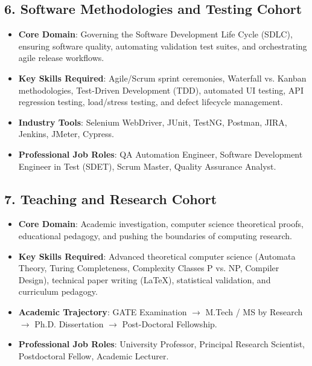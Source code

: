 \subsection{6. Software Methodologies and Testing Cohort}
\begin{itemize}[leftmargin=1.5em]
    \item \textbf{Core Domain}: Governing the Software Development Life Cycle (SDLC), ensuring software quality, automating validation test suites, and orchestrating agile release workflows.
    \item \textbf{Key Skills Required}: Agile/Scrum sprint ceremonies, Waterfall vs. Kanban methodologies, Test-Driven Development (TDD), automated UI testing, API regression testing, load/stress testing, and defect lifecycle management.
    \item \textbf{Industry Tools}: Selenium WebDriver, JUnit, TestNG, Postman, JIRA, Jenkins, JMeter, Cypress.
    \item \textbf{Professional Job Roles}: QA Automation Engineer, Software Development Engineer in Test (SDET), Scrum Master, Quality Assurance Analyst.
\end{itemize}

\subsection{7. Teaching and Research Cohort}
\begin{itemize}[leftmargin=1.5em]
    \item \textbf{Core Domain}: Academic investigation, computer science theoretical proofs, educational pedagogy, and pushing the boundaries of computing research.
    \item \textbf{Key Skills Required}: Advanced theoretical computer science (Automata Theory, Turing Completeness, Complexity Classes P vs. NP, Compiler Design), technical paper writing (LaTeX), statistical validation, and curriculum pedagogy.
    \item \textbf{Academic Trajectory}: GATE Examination $\rightarrow$ M.Tech / MS by Research $\rightarrow$ Ph.D. Dissertation $\rightarrow$ Post-Doctoral Fellowship.
    \item \textbf{Professional Job Roles}: University Professor, Principal Research Scientist, Postdoctoral Fellow, Academic Lecturer.
\end{itemize}

